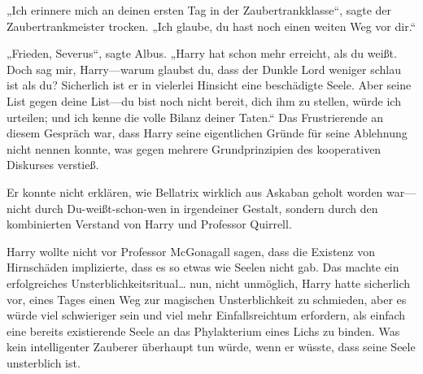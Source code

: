 „Ich erinnere mich an deinen ersten Tag in der Zaubertrankklasse“, sagte der Zaubertrankmeister trocken. „Ich glaube, du hast noch einen weiten Weg vor dir.“

„Frieden, Severus“, sagte Albus. „Harry hat schon mehr erreicht, als du weißt. Doch sag mir, Harry—warum glaubst du, dass der Dunkle Lord weniger schlau ist als du? Sicherlich ist er in vielerlei Hinsicht eine beschädigte Seele. Aber seine List gegen deine List—du bist noch nicht bereit, dich ihm zu stellen, würde ich urteilen; und ich kenne die volle Bilanz deiner Taten.“ \later Das Frustrierende an diesem Gespräch war, dass Harry seine eigentlichen Gründe für seine Ablehnung nicht nennen konnte, was gegen mehrere Grundprinzipien des kooperativen Diskurses verstieß.

Er konnte nicht erklären, wie Bellatrix wirklich aus Askaban geholt worden war—nicht durch Du-weißt-schon-wen in irgendeiner Gestalt, sondern durch den kombinierten Verstand von Harry und Professor Quirrell.

Harry wollte nicht vor Professor McGonagall sagen, dass die Existenz von Hirnschäden implizierte, dass es so etwas wie Seelen nicht gab. Das machte ein erfolgreiches Unsterblichkeitsritual… nun, nicht unmöglich, Harry hatte sicherlich vor, eines Tages einen Weg zur magischen Unsterblichkeit zu schmieden, aber es würde viel schwieriger sein und viel mehr Einfallsreichtum erfordern, als einfach eine bereits existierende Seele an das Phylakterium eines Lichs zu binden. Was kein intelligenter Zauberer überhaupt tun würde, wenn er wüsste, dass seine Seele unsterblich ist.

